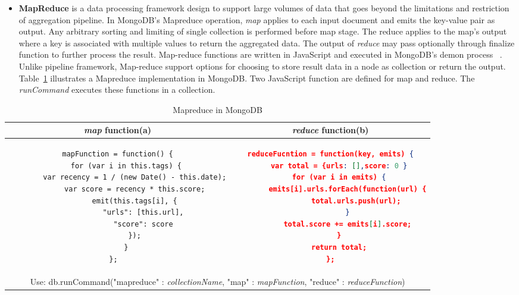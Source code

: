 \begin{itemize}
		  \item{\textbf{MapReduce}} is a data processing framework design to support large volumes of data that goes beyond the limitations and restriction of aggregation pipeline.  In MongoDB's Mapreduce operation,  \textit{map} applies to each input document and emits the key-value pair as output. Any arbitrary sorting and limiting  of single collection is performed before map stage. The reduce applies to the map's output where a key is associated with multiple values to return the aggregated data. The output of \textit{reduce} may pass optionally through finalize function to further process the result. Map-reduce functions are written in JavaScript and executed in MongoDB's demon process ~\cite{mongodbaggregation}.  Unlike pipeline framework, Map-reduce support options for choosing to store result  data in a node as collection or return the output. Table~\ref{mongdb-mapreduce} illustrates a Mapreduce implementation in MongoDB. Two JavaScript function are defined for map and reduce. The \textit{runCommand} executes these functions in a collection.
		  
\end{itemize}		

\begin{longtable}{c|c}
\caption{Mapreduce in MongoDB}
 \label{mongdb-mapreduce}\\
	
	{\textit{map}} function(a) & {\textit{reduce}} function(b)\\
	\hline
	\begin{minipage}{.4\textwidth}
		\centering		
		\begin{lstlisting}[language=XML,basicstyle = \scriptsize,label=couchbase-map-sample]
mapFunction = function() {
	for (var i in this.tags) {
		var recency = 1 / (new Date() - this.date);
		var score = recency * this.score;
		emit(this.tags[i], {
			"urls": [this.url],
			"score": score
		});
	}
};	
		\end{lstlisting}		
	\end{minipage} &
	\begin{minipage}{.49\textwidth}
		\centering
		\begin{lstlisting}[language=JSON, basicstyle =\scriptsize, label=couchbase-reduce-sample]
reduceFucntion = function(key, emits) {
	var total = {urls: [],score: 0 }
	for (var i in emits) {
		emits[i].urls.forEach(function(url) {
			total.urls.push(url);
		}
		total.score += emits[i].score;
	}
	return total;
};
		\end{lstlisting}
	\end{minipage}
	\\
	\hline
	\multicolumn{2}{c}{
	    \scriptsize
	    
	Use: 	db.runCommand({"mapreduce" : \textit{collectionName}, 
	                       "map" : \textit{mapFunction}, 
	                       "reduce" : \textit{reduceFunction}})
		
	}
  	
  	\\
	\hline
	
\end{longtable}

